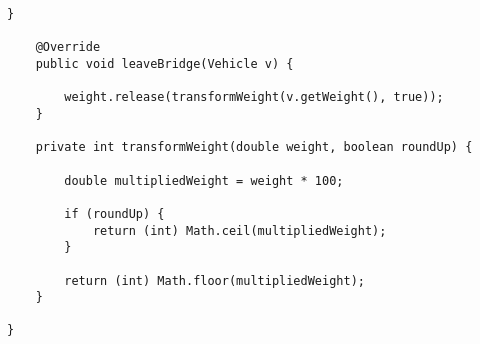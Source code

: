 \begin{itemize}
\begin{lstlisting}[style=java]
    }

    @Override
    public void leaveBridge(Vehicle v) {

        weight.release(transformWeight(v.getWeight(), true));
    }

    private int transformWeight(double weight, boolean roundUp) {

        double multipliedWeight = weight * 100;

        if (roundUp) {
            return (int) Math.ceil(multipliedWeight);
        }

        return (int) Math.floor(multipliedWeight);
    }

}

\end{lstlisting}

\end{itemize}

